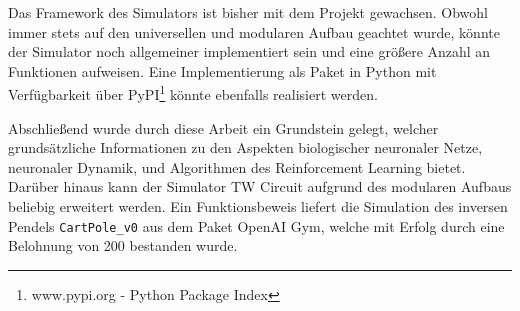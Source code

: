 	Das Framework des Simulators ist bisher mit dem Projekt gewachsen. Obwohl immer stets auf den universellen und modularen Aufbau geachtet wurde, könnte der Simulator noch allgemeiner implementiert sein und eine größere Anzahl an Funktionen aufweisen. Eine Implementierung als Paket in Python mit Verfügbarkeit über PyPI\footnote{www.pypi.org - Python Package Index} könnte ebenfalls realisiert werden.
	
	Abschließend wurde durch diese Arbeit ein Grundstein gelegt, welcher grundsätzliche Informationen zu den Aspekten biologischer neuronaler Netze, neuronaler Dynamik, und Algorithmen des Reinforcement Learning bietet. Darüber hinaus kann der Simulator TW Circuit aufgrund des modularen Aufbaus beliebig erweitert werden. Ein Funktionsbeweis liefert die Simulation des inversen Pendels \texttt{CartPole\_v0} aus dem Paket OpenAI Gym, welche mit Erfolg durch eine Belohnung von 200 bestanden wurde.

